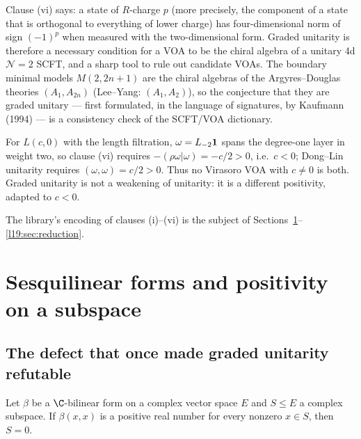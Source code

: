 \begin{physics}
Clause (vi) says: a state of $R$-charge $p$ (more precisely, the component of a state that is
orthogonal to everything of lower charge) has four-dimensional norm of sign $(-1)^p$ when measured
with the two-dimensional form. Graded unitarity is therefore a necessary condition for a VOA to be
the chiral algebra of a unitary 4d $\mathcal N=2$ SCFT, and a sharp tool to rule out candidate VOAs.
The boundary minimal models $M(2,2n+1)$ are the chiral algebras of the Argyres--Douglas theories
$(A_1,A_{2n})$ (Lee--Yang: $(A_1,A_2)$), so the conjecture that they are graded unitary --- first
formulated, in the language of signatures, by Kaufmann (1994) --- is a consistency check of the
SCFT/VOA dictionary.
\end{physics}

\begin{remark}\label{l19:rem:incompatible}
For $L(c,0)$ with the length filtration, $\omega = L_{-2}\mathbf{1}$ spans the degree-one layer in
weight two, so clause (vi) requires $-(\rho\omega|\omega) = -c/2 >0$, i.e.\ $c<0$; Dong--Lin
unitarity requires $(\omega,\omega) = c/2>0$. Thus no Virasoro VOA with $c\ne0$ is both. Graded
unitarity is not a weakening of unitarity: it is a different positivity, adapted to $c<0$.
\end{remark}

The library's encoding of clauses (i)--(vi) is the subject of
Sections~\ref{l19:sec:sesq}--\ref{l19:sec:reduction}.

\section{Sesquilinear forms and positivity on a subspace}\label{l19:sec:sesq}

\subsection{The defect that once made graded unitarity refutable}

\begin{theorem}\label{l19:thm:bilpos}
Let $\beta$ be a $\C$-bilinear form on a complex vector space $E$ and $S\le E$ a complex subspace.
If $\beta(x,x)$ is a positive real number for every nonzero $x\in S$, then $S = 0$.
\end{theorem}

